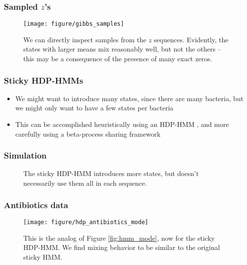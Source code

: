 \documentclass{beamer}
\begin{document}
\begin{frame}
  \frametitle{Sampled $z$'s}
\begin{figure}[ht]
  \centering
  \texttt{[image: figure/gibbs\_samples]}
  \caption{We can directly inspect samples from the $z$ sequences. Evidently,
    the states with larger means mix reasonably well, but not the others --
    this may be a consequence of the presence of many exact
    zeros. \label{fig:gibbs_samples} }
\end{figure}
\end{frame}

\begin{frame}
  \frametitle{Sticky HDP-HMMs}
 \begin{itemize}
 \item We might want to introduce many states, since there are many bacteria,
   but we might only want to have a few states per bacteria
 \item This can be accomplished heuristically using an HDP-HMM
   \citep{fox2007sticky}, and more carefully using a beta-process sharing
   framework \citep{fox2009sharing}
 \end{itemize} 
\end{frame}

\begin{frame}
  \frametitle{Simulation}
  \begin{figure}
    \centering
    \qquad
    \caption{The sticky HDP-HMM introduces more states, but doesn't necessarily
      use them all in each sequence.}
    \label{fig:sticky_hdp_hmm}
  \end{figure}
\end{frame}

\begin{frame}
  \frametitle{Antibiotics data}
  \begin{figure}[ht]
    \centering
    \texttt{[image: figure/hdp\_antibiotics\_mode]}
    \caption{This is the analog of Figure \ref{fig:hmm_mode}, now for the sticky
      HDP-HMM. We find mixing behavior to be similar to the original sticky
      HMM. \label{fig:hdp_mode} }
  \end{figure}
\end{frame}
\end{document}
